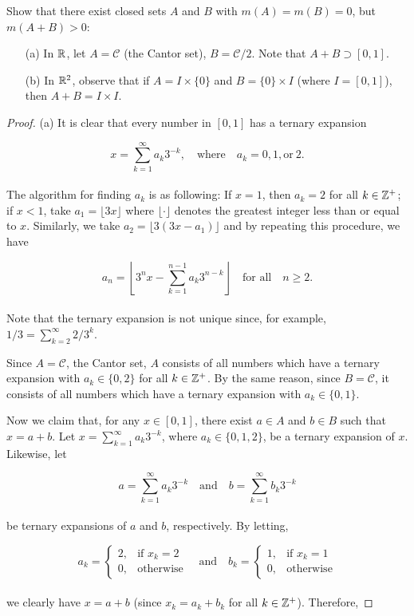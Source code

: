 \documentclass[12pt, a4paper, openany, twoside]{book}
\theoremstyle{definition}
\theoremstyle{remark}
\theoremstyle{plain}
\numberwithin{equation}{section}
\begin{document}
\newpage

\begin{tcolorbox}[colback=yellow!10!white,colframe=gray!75!black,title=Exercise 1.20]\label{Exercise 1.20.}
    Show that there exist closed sets $A$ and $B$ with $m(A)=m(B)=0$, but $m(A+B)>0$:
    \begin{enumerate}
        \item [(a)] In ${\mathbb {R}}$, let $A=\mathcal{C}$ (the Cantor set), $B=\mathcal{C}/2$. Note that $A+B\supset [0,1]$.
        \item [(b)] In ${\mathbb {R}}^2$, observe that if $A=I\times\{0\}$ and $B=\{0\}\times I$ (where $I=[0,1]$), then $A+B=I\times I$.
    \end{enumerate}
\end{tcolorbox}
\begin{proof}
    (a) It is clear that every number in $[0,1]$ has a ternary expansion 

    \[x=\sum_{k=1}^{\infty}{a_k3^{-k}},\quad\text{where}\quad a_k=0,1, \text{or}\ 2.\]
    \\
    The algorithm for finding $a_k$ is as following: If $x=1$, then $a_k=2$ for all $k\in{\mathbb {Z}}^+$; if $x<1$, take $a_1=\lfloor 3x\rfloor$ where $\lfloor\cdot\rfloor$ denotes the greatest integer less than or equal to $x$. Similarly, we take $a_2=\lfloor3(3x-a_1)\rfloor$ and by repeating this procedure, we have

    \[a_n=\left\lfloor3^nx-\sum_{k=1}^{n-1}{a_k3^{n-k}}\right\rfloor\quad\text{for all}\quad n\geq 2.\]
    \\
    Note that the ternary expansion is not unique since, for example, $1/3=\sum_{k=2}^{\infty}{2/3^k}$.

    Since $A=\mathcal{C}$, the Cantor set, $A$ consists of all numbers which have a ternary expansion with $a_k\in\{0,2\}$ for all $k\in{\mathbb {Z}}^+$. By the same reason, since $B=\mathcal{C}$, it consists of all numbers which have a ternary expansion with $a_k\in\{0,1\}$.

    Now we claim that, for any $x\in [0,1]$, there exist $a\in A$ and $b\in B$ such that $x=a+b$. Let $x=\sum_{k=1}^{\infty}{a_k3^{-k}}$, where $a_k\in\{0,1,2\}$, be a ternary expansion of $x$. Likewise, let

    \[a=\sum_{k=1}^{\infty}{a_k3^{-k}}\quad\text{and}\quad b=\sum_{k=1}^{\infty}{b_k3^{-k}}\]
    \\
    be ternary expansions of $a$ and $b$, respectively. By letting, 

    \[a_k=\begin{cases}
        2, & \text{if $x_k=2$}\\
        0, & \text{otherwise}
    \end{cases}\quad\text{and}\quad b_k=\begin{cases}
        1, & \text{if $x_k=1$}\\
        0, & \text{otherwise}
    \end{cases}\]
    \\
    we clearly have $x=a+b$ (since $x_k=a_k+b_k$ for all $k\in{\mathbb {Z}}^+$). Therefore,


\end{proof}
\end{document}
